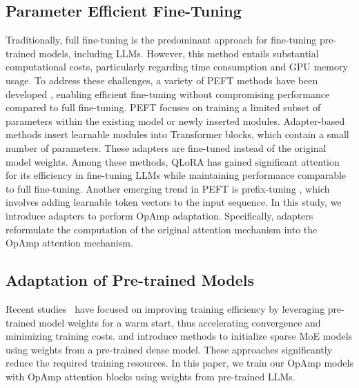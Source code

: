 \subsection{Parameter Efficient Fine-Tuning}
Traditionally, full fine-tuning is the predominant approach for fine-tuning pre-trained models, including LLMs. 
However, this method entails substantial computational costs, particularly regarding time consumption and GPU memory usage. 
To address these challenges, a variety of PEFT methods have been developed \cite{houlsby2019adapter, hu2021lora, dettmers2024qlora, wu2024pesc, li2021prefixtuning, lester2021prompttuning}, enabling efficient fine-tuning without compromising performance compared to full fine-tuning. 
PEFT focuses on training a limited subset of parameters within the existing model or newly inserted modules.
Adapter-based methods \cite{houlsby2019adapter, hu2021lora, dettmers2024qlora, wu2024pesc} insert learnable modules into Transformer blocks, which contain a small number of parameters. 
These adapters are fine-tuned instead of the original model weights. 
Among these methods, QLoRA \cite{dettmers2024qlora} has gained significant attention for its efficiency in fine-tuning LLMs while maintaining performance comparable to full fine-tuning.
Another emerging trend in PEFT is prefix-tuning \cite{lester2021prompttuning, li2021prefixtuning}, which involves adding learnable token vectors to the input sequence. 
In this study, we introduce adapters to perform OpAmp adaptation. 
Specifically, adapters reformulate the computation of the original attention mechanism into the OpAmp attention mechanism.

\subsection{Adaptation of Pre-trained Models}
Recent studies~\cite{chen2015net2net, lin2021m610t, komatsuzaki2022sparseupcycle, wu2024pesc} have focused on improving training efficiency by leveraging pre-trained model weights for a warm start, thus accelerating convergence and minimizing training costs.
\citet{komatsuzaki2022sparseupcycle} and \citet{wu2024pesc} introduce methods to initialize sparse MoE models using weights from a pre-trained dense model.
These approaches significantly reduce the required training resources.
In this paper, we train our OpAmp models with OpAmp attention blocks using weights from pre-trained LLMs.